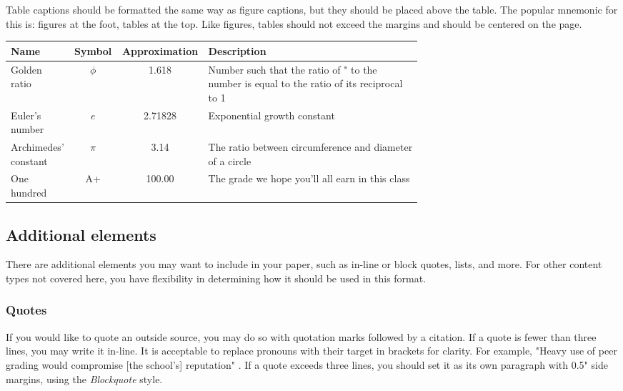 \documentclass[
	letterpaper, %
]{jdf}
\begin{document}
Table captions should be formatted the same way as figure captions, but they should be placed above the table. The popular mnemonic for this is: figures at the foot, tables at the top. Like figures, tables should not exceed the margins and should be centered on the page.

\begin{jdftable}
\label{table:Example}
\small %
\begin{tabular}{@{} L{0.15\linewidth} c S L{0.52\linewidth}}
	\textbf{Name} & \textbf{Symbol} & \textbf{Approximation} & \textbf{Description} \\
	\toprule[0.5pt]
	Golden ratio & $\phi$ & 1.618 & Number such that the ratio of " to the number is equal to the ratio of its reciprocal to 1\\
	\midrule
	Euler's number & $e$ & 2.71828 & Exponential growth constant\\
	\midrule
	Archimedes' constant & $\pi$ & 3.14 & The ratio between circumference and diameter of a circle\\
	\midrule
	One hundred & A+ & 100.00 & The grade we hope you’ll all earn in this class\\
\end{tabular}
\end{jdftable}

\subsection{Additional elements}
There are additional elements you may want to include in your paper, such as in-line or block quotes, lists, and more. For other content types not covered here, you have flexibility in determining how it should be used in this format.

\subsubsection{Quotes}
If you would like to quote an outside source, you may do so with quotation marks followed by a citation. If a quote is fewer than three lines, you may write it in-line. It is acceptable to replace pronouns with their target in brackets for clarity. For example, "Heavy use of peer grading would compromise [the school’s] reputation" \citep{joyner2016}. If a quote exceeds three lines, you should set it as its own paragraph with 0.5" side margins, using the \emph{Blockquote} style.
\end{document}
